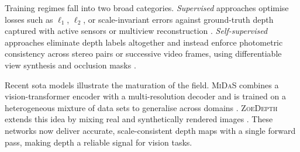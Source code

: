 Training regimes fall into two broad categories. \emph{Supervised} approaches
optimise losses such as $\ell_1$, $\ell_2$, or scale-invariant errors against
ground-truth depth captured with active sensors or multiview reconstruction
\cite{laina2016deeper}. \emph{Self-supervised} approaches eliminate depth
labels altogether and instead enforce photometric consistency across stereo
pairs or successive video frames, using differentiable view synthesis and
occlusion masks \cite{godard2017unsupervised,zhou2017unsupervised}.

Recent sota models illustrate the maturation of the field. \textsc{MiDaS}
combines a vision-transformer encoder with a multi-resolution decoder and is
trained on a heterogeneous mixture of data sets to generalise across domains
\cite{ranftl2021robust,ranftl2022dense}. \textsc{ZoeDepth} extends this idea by
mixing real and synthetically rendered images \cite{khattak2023zoedepth}. These
networks now deliver accurate, scale-consistent depth maps with a single
forward pass, making depth a reliable signal for vision tasks.